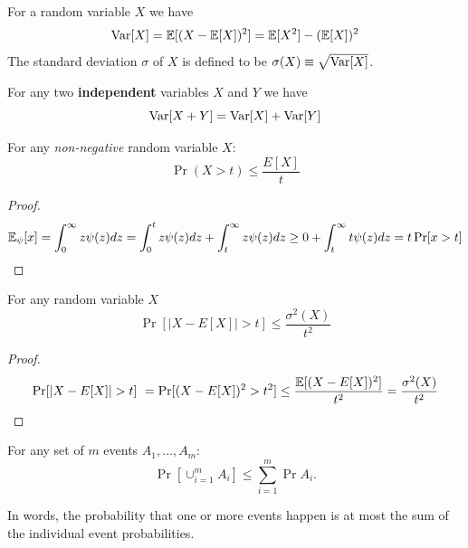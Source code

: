 \documentclass{article}
\begin{document}
\begin{definition}[Variance]%
For a random variable $X$ we have 
\begin{equation}
{\operatorname{Var}}[X] = {\mathbb E}[(X - {\mathbb E}[X])^2] = {\mathbb E}[X^2] - ({\mathbb E}[X])^2
\end{equation}
The standard deviation $\sigma$ of $X$ is defined to be $\sigma(X) \equiv \sqrt{{\operatorname{Var}}[X]}$.
\end{definition}

\begin{definition}%
For any two {\bf independent} variables $X$ and $Y$ we have 
\begin{equation}
{\operatorname{Var}}[X + Y] = {\operatorname{Var}}[X] + {\operatorname{Var}}[Y]
\end{equation}
\end{definition}

\begin{fact}%
For any {\it non-negative} random variable $X$:
\begin{equation}
\Pr(X > t) \le \frac{E[X]}{t}
\end{equation}
\end{fact}
\begin{proof}
\[
{\mathbb E}_\psi[x] = \int_0^{\infty} z\psi(z)dz = \int_0^{t} z\psi(z)dz + \int_t^{\infty} z\psi(z)dz \ge 0 + \int_t^{\infty} t\psi(z)dz = t \Pr[x>t]
\]
\end{proof}

\begin{fact}%
For any random variable $X$
\begin{equation}
\Pr[|X-E[X]| > t] \le \frac{\sigma^2(X)}{t^2}
\end{equation}
\end{fact}
\begin{proof}
\[
\Pr[|X-E[X]| > t]  = \Pr[(X-E[X])^2 > t^2] \le \frac{\E[(X-E[X])^2]}{t^2} = \frac{\sigma^2(X)}{t^2}
\]
\end{proof}

\begin{lemma}
For any set of $m$ events $A_1,\ldots,A_m$:
\[
\Pr[\cup_{i=1}^{m}A_i] \le \sum_{i=1}^{m}\Pr{A_i}.
\]
\end{lemma}
In words, the probability that one or more events happen is at most the sum of the 
individual event probabilities. 
\end{document}
